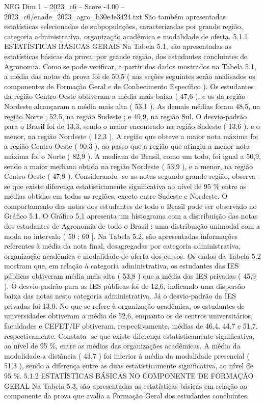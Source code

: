 \begin{textsample}{NEG Dim 1 – 2023\_c6 – Score -4.00 – 2023\_c6/enade\_2023\_agro\_b30e4e3424.txt}
São também apresentadas estatísticas selecionadas de subpopulações, caracterizadas por grande região, categoria administrativa, organização acadêmica e modalidade de oferta. 5.1.1 ESTATÍSTICAS BÁSICAS GERAIS Na Tabela 5.1, são apresentadas as estatísticas básicas da prova, por grande região, dos estudantes concluintes de Agronomia.
Como se pode verificar, a partir dos dados mostrados na Tabela 5.1, a média das notas da prova foi de 50,5 ( nas seções seguintes serão analisados os componentes de Formação Geral e de Conhecimento Específico ).
Os estudantes da região Centro-Oeste obtiveram a média mais baixa ( 47,6 ), e os da região Nordeste alcançaram a média mais alta ( 53,1 ).
As demais médias foram 48,5, na região Norte ; 52,5, na região Sudeste ; e 49,9, na região Sul.
O desvio-padrão para o Brasil foi de 13,3, sendo o maior encontrado na região Sudeste ( 13,6 ), e o menor, na região Nordeste ( 12,3 ).
A região que obteve a maior nota máxima foi a região Centro-Oeste ( 90,3 ), ao passo que a região que atingiu a menor nota máxima foi o Norte ( 82,9 ).
A mediana do Brasil, como um todo, foi igual a 50,9, sendo a maior mediana obtida na região Nordeste ( 53,9 ), e a menor, na região Centro-Oeste ( 47,9 ).
Considerando -se as notas segundo grande região, observa -se que existe diferença estatisticamente significativa ao nível de 95 \% entre as médias obtidas em todas as regiões, exceto entre Sudeste e Nordeste.
O comportamento das notas dos estudantes de todo o Brasil pode ser observado no Gráfico 5.1.
O Gráfico 5.1 apresenta um histograma com a distribuição das notas dos estudantes de Agronomia de todo o Brasil : uma distribuição unimodal com a moda no intervalo ( 50 ; 60 ].
Na Tabela 5.2, são apresentadas informações referentes à média da nota final, desagregadas por categoria administrativa, organização acadêmica e modalidade de oferta dos cursos.
Os dados da Tabela 5.2 mostram que, em relação à categoria administrativa, os estudantes das IES públicas obtiveram média mais alta ( 53,8 ) que a média das IES privadas ( 45,9 ).
O desvio-padrão para as IES públicas foi de 12,6, indicando uma dispersão baixa das notas nesta categoria administrativa.
Já o desvio-padrão da IES privadas foi 13,0.
No que se refere à organização acadêmica, os estudantes de universidades obtiveram a média de 52,6, enquanto os de centros universitários, faculdades e CEFET/IF obtiveram, respectivamente, médias de 46,4, 44,7 e 51,7, respectivamente.
Constata -se que existe diferença estatisticamente significativa, ao nível de 95 \%, entre as médias das organizações acadêmicas.
A média da modalidade a distância ( 43,7 ) foi inferior à média da modalidade presencial ( 51,3 ), sendo a diferença entre as duas estatisticamente significativa, ao nível de 95 \%. 5.1.2 ESTATÍSTICAS BÁSICAS NO COMPONENTE DE FORMAÇÃO GERAL Na Tabela 5.3, são apresentadas as estatísticas básicas em relação ao componente da prova que avalia a Formação Geral dos estudantes concluintes.

\end{textsample}
